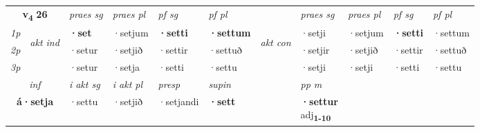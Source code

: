 \noindent
\begin{tabular}{lllllllllll} \toprule
\multicolumn{2}{c}{\textbf{v{\textsubscript{4}}} \Large{\textbf{26}}}  &  \textit{praes sg}  & \textit{praes pl}  &\textit{ pf sg} & \textit{pf pl} &  &  \textit{praes sg}  & \textit{praes pl}  & \textit{pf sg} & \textit{pf pl } \\*
	\cmidrule{3-6} \cmidrule{8-11}
 {\textit{1p}} & \multirow{3}{*}{\begin{turn}{90}\textit{akt ind}\end{turn}} & \textbf{·set} & ·setjum & \textbf{·setti} & \textbf{·settum} & \multirow{3}{*}{\begin{turn}{90}\textit{akt con}\end{turn}} &·setji & ·setjum & \textbf{·setti} & ·settum\\*
 {\textit{2p}} &  &  ·setur  & ·setjið & ·settir & ·settuð & & ·setjir & ·setjið & ·settir & ·settuð \\*
{\textit{3p}} &  & ·setur & ·setja & ·setti & ·settu & & ·setji & ·setji& ·setti & ·settu \\*
\cmidrule{3-6} \cmidrule{8-11}

   \multicolumn{2}{c}{\textit{inf}}  & \textit{i akt sg} & \textit{i akt pl}   & \textit{presp} & \textit{supin}  && \textit{pp m} \\*
  \multicolumn{2}{c}{\textbf{á\allowbreak ·setja}} & ·settu  & ·setjið   & ·setjandi &  \textbf{·sett}  && \specialcell{\textbf{·settur} \\ adj\textbf{\textsubscript{1-10}}} \\*
\end{tabular}

